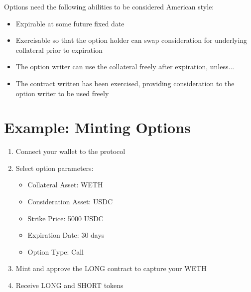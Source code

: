 \documentclass[%
 reprint,
 amsmath,amssymb,
 aps,
]{revtex4-2}
\begin{document}
Options need the following abilities to be considered American style:
\begin{itemize}
  \setlength{\itemsep}{0pt}
  \setlength{\parskip}{0pt}
  \item Expirable at some future fixed date
  \item Exercisable so that the option holder can swap consideration for underlying collateral prior to expiration
  \item The option writer can use the collateral freely after expiration, unless...
  \item The contract written has been exercised, providing consideration to the option writer to be used freely
\end{itemize}

  \section{Example: Minting Options}

  \begin{enumerate}
  \item
    Connect your wallet to the protocol
  \item
    Select option parameters:
    \begin{itemize}
    \item
      Collateral Asset: WETH
    \item
      Consideration Asset: USDC
    \item
      Strike Price: 5000 USDC
    \item
      Expiration Date: 30 days
    \item
      Option Type: Call
    \end{itemize}
  \item
    Mint and approve the LONG contract to capture your WETH
  \item
    Receive LONG and SHORT tokens
  \end{enumerate}
  

\end{document}
